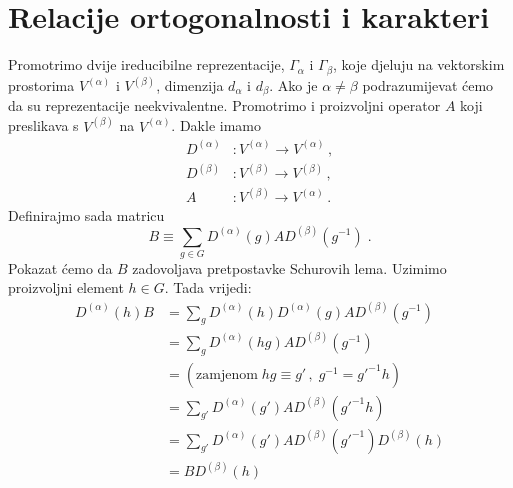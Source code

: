 \section{Relacije ortogonalnosti i karakteri}
\label{sec:ortogonalnost}

Promotrimo dvije ireducibilne reprezentacije, $\Gamma_{\alpha}$ i $\Gamma_{\beta}$,
koje djeluju na vektorskim prostorima $V^{(\alpha)}$ i $V^{(\beta)}$,
dimenzija $d_\alpha$ i $d_\beta$.
Ako je $\alpha\neq\beta$ podrazumijevat ćemo da su reprezentacije neekvivalentne.
Promotrimo i proizvoljni operator $A$ koji preslikava s $V^{(\beta)}$ na  $V^{(\alpha)}$.
Dakle imamo
\begin{align*}
D^{(\alpha)} &: V^{(\alpha)} \to V^{(\alpha)}\,, \\
D^{(\beta)}  &: V^{(\beta)}  \to V^{(\beta)} \,, \\
A          &: V^{(\beta)} \to V^{(\alpha)} \,.
\end{align*}
Definirajmo sada matricu
\begin{equation*}
B\equiv \sum_{g\in G} D^{(\alpha)}(g) A D^{(\beta)}(g^{-1}) \;.
\end{equation*}
Pokazat ćemo da $B$ zadovoljava pretpostavke Schurovih lema.
Uzimimo proizvoljni element $h\in G$. Tada vrijedi:
\begin{equation}
\begin{split}
 D^{(\alpha)}(h)B &= \sum_g D^{(\alpha)}(h) D^{(\alpha)}(g) A
    D^{(\beta)}(g^{-1}) \\
&= \sum_g D^{(\alpha)}(hg) A D^{(\beta)}(g^{-1}) \\
&= ( \textrm{zamjenom}\; hg\equiv g' \, , \; g^{-1}=g'^{-1}h )  \label{eq:gshift} \\
&= \sum_{g'} D^{(\alpha)}(g') A D^{(\beta)}(g'^{-1}h) \\
&= \sum_{g'} D^{(\alpha)}(g') A D^{(\beta)}(g'^{-1}) D^{(\beta)}(h) \\
&= B D^{(\beta)}(h)
\end{split}
\end{equation}

